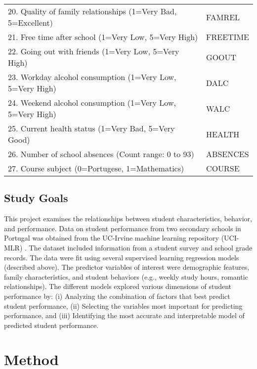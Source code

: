 \documentclass[sigconf]{acmart}
\begin{document}
\begin{table*}[ht]
\begin{tabular}{ll}
    20. Quality of family relationships (1=Very Bad, 5=Excellent) & FAMREL  \\
    21. Free time after school (1=Very Low, 5=Very High) & FREETIME  \\
    22. Going out with friends (1=Very Low, 5=Very High) & GOOUT  \\
    23. Workday alcohol consumption (1=Very Low, 5=Very High) & DALC  \\
    24. Weekend alcohol consumption (1=Very Low, 5=Very High) & WALC  \\
    25. Current health status (1=Very Bad, 5=Very Good) & HEALTH  \\ 
    26. Number of school absences (Count range: 0 to 93) & ABSENCES  \\
    27. Course subject (0=Portugese, 1=Mathematics) & COURSE  \\
    \bottomrule
  \end{tabular}
\end{table*}


\subsection{Study Goals} 

This project examines the relationships between student characteristics,  
behavior, and performance. Data on student performance from two secondary 
schools in Portugal was obtained from the UC-Irvine machine learning 
repository (UCI-MLR) \cite{cortez08}. The dataset included information 
from a student survey and school grade records. The data were fit using 
several supervised learning regression models (described above). The 
predictor variables of interest were demographic features, family 
characteristics, and student behaviors (e.g., weekly study hours, romantic 
relationships). The different models explored various dimensions of student 
performance by: (i) Analyzing the combination of factors that best predict 
student performance, (ii) Selecting the variables most important for 
predicting performance, and (iii) Identifying the most accurate and 
interpretable model of predicted student performance. 


\section{Method}
\end{document}
